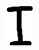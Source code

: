 \documentclass[russian,utf8,emptystyle]{eskdtext}
\begin{document}
\begin{figure}[!htb]
\includegraphics[width=\linewidth]{../data/learn/i/001}
\endminipage\hfill
{}

\end{figure}
\end{document}
